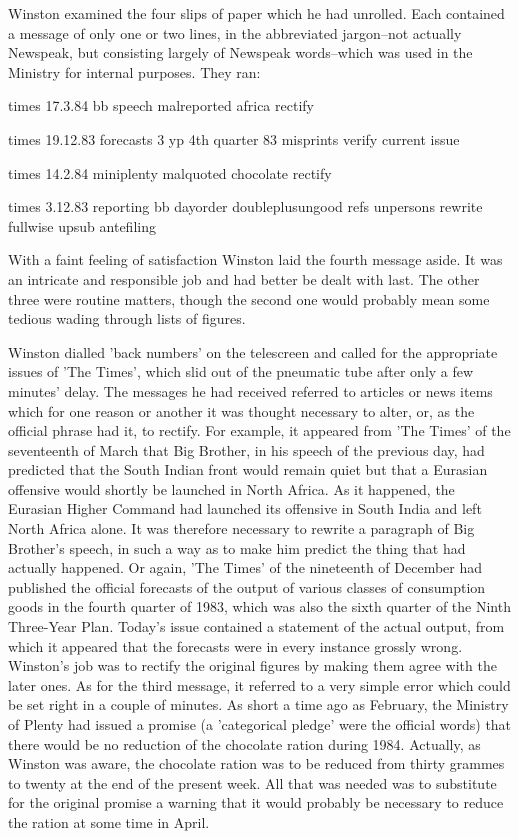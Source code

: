 \documentclass{article}
\begin{document}
Winston examined the four slips of paper which he had unrolled. Each
contained a message of only one or two lines, in the abbreviated
jargon--not actually Newspeak, but consisting
largely of Newspeak words--which was used in the Ministry for internal
purposes. They ran:


times 17.3.84 bb speech malreported africa rectify

times 19.12.83 forecasts 3 yp 4th quarter 83 misprints verify current issue

times 14.2.84 miniplenty malquoted chocolate rectify

times 3.12.83 reporting bb dayorder doubleplusungood refs unpersons rewrite
fullwise upsub antefiling


With a faint feeling of satisfaction Winston laid the fourth message aside.
It was an intricate and responsible job and had better be dealt with last.
The other three were routine matters, though the second one would probably
mean some tedious wading through lists of figures.

Winston dialled 'back numbers' on the telescreen and called for the
appropriate issues of 'The Times', which slid out of the pneumatic tube
after only a few minutes' delay. The messages he had received referred to
articles or news items which for one reason or another it was thought
necessary to alter, or, as the official phrase had it, to rectify. For
example, it appeared from 'The Times' of the seventeenth of March that Big
Brother, in his speech of the previous day, had predicted that the South
Indian front would remain quiet but that a Eurasian offensive would shortly
be launched in North Africa. As it happened, the Eurasian Higher Command
had launched its offensive in South India and left North Africa alone. It
was therefore necessary to rewrite a paragraph of Big Brother's speech, in
such a way as to make him predict the thing that had actually happened. Or
again, 'The Times' of the nineteenth of December had published the official
forecasts of the output of various classes of consumption goods in the
fourth quarter of 1983, which was also the sixth quarter of the Ninth
Three-Year Plan. Today's issue contained a statement of the actual output,
from which it appeared that the forecasts were in every instance grossly
wrong. Winston's job was to rectify the original figures by making them
agree with the later ones. As for the third message, it referred to a very
simple error which could be set right in a couple of minutes. As short
a time ago as February, the Ministry of Plenty had issued a promise
(a 'categorical pledge' were the official words) that there would be
no reduction of the chocolate ration during 1984. Actually, as Winston
was aware, the chocolate ration was to be reduced from thirty grammes
to twenty at the end of the present week. All that was needed was to
substitute for the original promise a warning that it would probably be
necessary to reduce the ration at some time in April.
\end{document}
